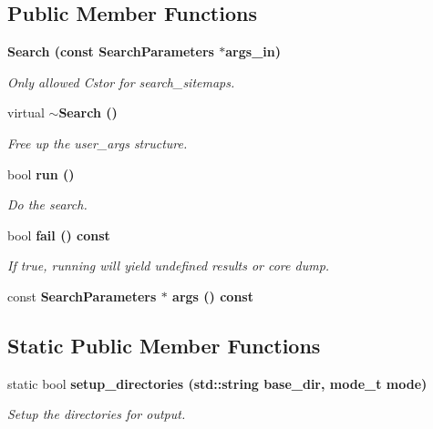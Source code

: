 \subsection*{Public Member Functions}
\begin{CompactItemize}
\item 
\bf{Search} (const \bf{Search\-Parameters} $\ast$args\_\-in)\label{classSimSite3D_1_1Search_ff7b007d7a7b19f5009d205ec68ce465}

\begin{CompactList}\small\item\em Only allowed Cstor for search\_\-sitemaps. \item\end{CompactList}\item 
virtual \bf{$\sim$Search} ()\label{classSimSite3D_1_1Search_4cdd25e61eac9ffe50b2aaa79a8a728b}

\begin{CompactList}\small\item\em Free up the user\_\-args structure. \item\end{CompactList}\item 
bool \bf{run} ()
\begin{CompactList}\small\item\em Do the search. \item\end{CompactList}\item 
bool \bf{fail} () const 
\begin{CompactList}\small\item\em If true, running will yield undefined results or core dump. \item\end{CompactList}\item 
const \bf{Search\-Parameters} $\ast$ \textbf{args} () const \label{classSimSite3D_1_1Search_ed92b23eb8bdd71f0ba4efcde810c99b}

\end{CompactItemize}
\subsection*{Static Public Member Functions}
\begin{CompactItemize}
\item 
static bool \bf{setup\_\-directories} (std::string base\_\-dir, mode\_\-t mode)\label{classSimSite3D_1_1Search_04389ee319e0961afe77b5c5f4f93a70}

\begin{CompactList}\small\item\em Setup the directories for output. \item\end{CompactList}\end{CompactItemize}

